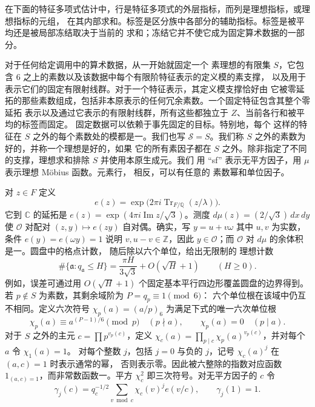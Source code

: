 \documentclass[11pt,a4paper]{article}
\numberwithin{equation}{section}
\numberwithin{figure}{section}
\theoremstyle{definition}
\theoremstyle{remark}
\begin{document}
在下面的特征多项式估计中，行是特征多项式的外层指标，而列是理想指标，或理想指标的元组，
在其内部求和。标签是区分族中各部分的辅助指标。标签是被平均还是被局部冻结取决于当前的
求和；冻结它并不使它成为固定算术数据的一部分。

对于任何给定调用中的算术数据，从一开始就固定一个
素理想的有限集 $S$，它包含 $6$ 之上的素数以及该数据中每个有限阶特征表示的定义模的素支撑，
以及用于表示它们的固定有限射线群。对于一个特征表示，其定义模支撑恰好由
它被零延拓的那些素数组成，包括非本原表示的任何冗余素数。一个固定特征包含其整个零延拓
表示以及通过它表示的有限射线群，所有这些都独立于 $Z$、当前各行和被平均的标签而固定。
固定数据可以依赖于事先固定的目标。特别地，每个
这样的特征在 $S$ 之外的每个素数处的模都是一。我们也写
$\mathcal S=S$。我们称 $S$ 之外的素数为好的，并称一个理想是好的，如果
它的所有素因子都在 $S$ 之外。除非指定了不同的支撑，理想求和排除 $S$ 并使用本原生成元。我们
用 ``sf'' 表示无平方因子，用 $\mu$ 表示理想 M\"obius 函数。元素行，
相反，可以有任意的
素数幂和单位因子。

对 $z\in F$ 定义
\[
 e(z)=\exp\bigl(2\pi i\operatorname{Tr}_{F/\mathbb Q}(z/\lambda)\bigr).
\]
它到 $\mathbb C$ 的延拓是
$e(z)=\exp(4\pi i\operatorname{Im}z/\sqrt3)$。测度
$d\mu(z)=(2/\sqrt3)\,dx\,dy$ 使 $\mathcal O$ 对配对
$(z,y)\mapsto e(zy)$ 自对偶。确实，写 $y=u+v\omega$ 其中 $u,v$ 为实数，条件
$e(y)=e(\omega y)=1$ 说明 $v,u-v\in\mathbb Z$，因此
$y\in\mathcal O$；而 $\mathcal O$ 对 $d\mu$ 的余体积是一。圆盘中的格点计数，
随后除以六个单位，给出无限制的
理想计数
\[
 \#\{\mathfrak a:q_{\mathfrak a}\le H\}
 =\frac{\pi H}{3\sqrt3}+O(\sqrt H+1)\qquad(H\ge0).
\]
例如，误差可通过用
$O(\sqrt H+1)$ 个固定基本平行四边形覆盖圆盘的边界得到。若 $p\notin S$ 为素数，其剩余域阶为 $P=q_p\equiv1\pmod6$：
六个单位根在该域中仍互不相同。定义六次符号
$\chi_p(a)=(a/p)_6$ 为满足下式的唯一六次单位根
\[
 \chi_p(a)\equiv a^{(P-1)/6}\pmod p\quad(p\nmid a),
 \qquad \chi_p(a)=0\quad(p\mid a).
\]
对于 $S$ 之外的主元 $c=\prod p^{v_p(c)}$，定义
$\chi_c(a)=\prod_{p\mid c}\chi_p(a)^{v_p(c)}$，并对每个 $a$ 令 $\chi_1(a)=1$。
对每个整数 $j$，包括 $j=0$ 与负的 $j$，记号 $\chi_c(a)^j$ 在 $(a,c)=1$ 时表示通常的幂，
否则表示零。因此被六整除的指数对应函数
$1_{(a,c)=1}$，而非常数函数一。平方 $\chi_c^2$ 即三次符号。对无平方因子的 $c$ 令
\[
 \gamma_j(c)=q_c^{-1/2}\sum_{v\bmod c}\chi_c(v)^j e(v/c),
 \qquad \gamma_j(1)=1.
\]
\end{document}
